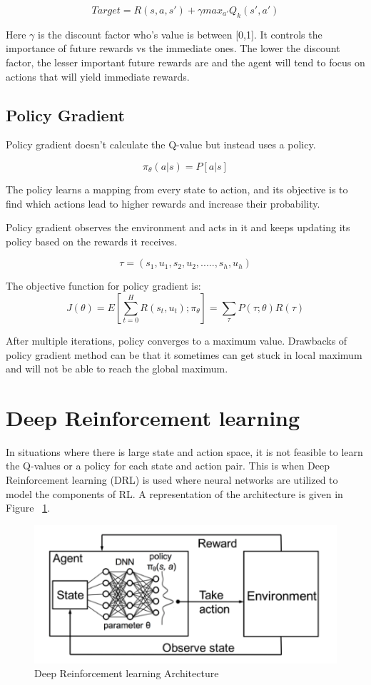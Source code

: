 \documentclass[12pt]{report}
\begin{document}
\[ Target = R(s,a,s') + \gamma max_{a'} Q_k (s', a') \] 

Here $\gamma$ is the discount factor who's value is between [0,1]. It controls the importance of future rewards vs the immediate ones. The lower the discount factor, the lesser important future rewards are and the agent will tend to focus on actions that will yield immediate rewards.    

\subsection{Policy Gradient} Policy gradient doesn't calculate the Q-value but instead uses a policy. 

\[ \pi_\theta (a | s) = P [ a | s ] \]

The policy learns a mapping from every state to action, and its objective is to find which actions lead to higher rewards and increase their probability. 

Policy gradient observes the environment and acts in it and keeps updating its policy based on the rewards it receives. 

\[ \tau = (s_1, u_1, s_2, u_2, ....., s_h, u_h ) \]

The objective function for policy gradient is:
\[ J(\theta) = E[\sum_{t=0}^{H} R(s_t, u_t); \pi_\theta] = \sum_{\tau} P(\tau;\theta) R(\tau) \] 

After multiple iterations, policy converges to a maximum value. Drawbacks of policy gradient method can be that it sometimes can get stuck in local maximum and will not be able to reach the global maximum.  

\section{Deep Reinforcement learning}

In situations where there is large state and action space, it is not feasible to learn the Q-values or a policy for each state and action pair. This is when Deep Reinforcement learning (DRL) is used where neural networks are utilized to model the components of RL. A representation of the architecture is given in Figure ~\ref{fig:DRLArchitecture}. 

\begin{figure}[!h]
    \centering
    \includegraphics[width=12cm]{DRLArchitecture.png}
    \caption{Deep Reinforcement learning Architecture \cite{Mao}}
    \label{fig:DRLArchitecture}
\end{figure}
\end{document}
